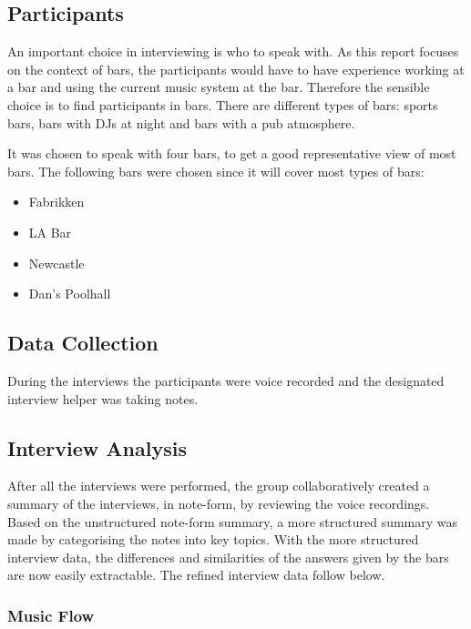 \subsection{Participants}

An important choice in interviewing is who to speak with. As this report focuses on the context of bars, the participants would have to have experience working at a bar and using the current music system at the bar. Therefore the sensible choice is to find participants in bars. There are different types of bars: sports bars, bars with DJs at night and bars with a pub atmosphere.

It was chosen to speak with four bars, to get a good representative view of most bars. The following bars were chosen since it will cover most types of bars:

\begin{itemize}
  \item Fabrikken
  \item LA Bar
  \item Newcastle
  \item Dan's Poolhall
\end{itemize}

\subsection{Data Collection}
\label{sub:data_collection}

During the interviews the participants were voice recorded and the designated interview helper was taking notes.

\subsection{Interview Analysis}
\label{sub:interview_analysis}

After all the interviews were performed, the group collaboratively created a summary of the interviews, in note-form, by reviewing the voice recordings. Based on the unstructured note-form summary, a more structured summary was made by categorising the notes into key topics. With the more structured interview data, the differences and similarities of the answers given by the bars are now easily extractable. The refined interview data follow below.

\subsubsection{Music Flow}
\label{ssub:Music Flow}

